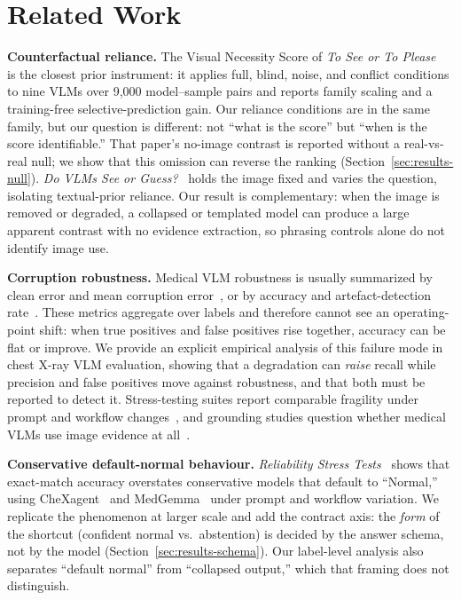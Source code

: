 \section{Related Work}
\label{sec:related}

\textbf{Counterfactual reliance.} The Visual Necessity Score of \emph{To See or To Please}~\citep{hong2026see} is the closest prior instrument: it applies full, blind, noise, and conflict conditions to nine VLMs over 9,000 model--sample pairs and reports family scaling and a training-free selective-prediction gain. Our reliance conditions are in the same family, but our question is different: not ``what is the score'' but ``when is the score identifiable.'' That paper's no-image contrast is reported without a real-vs-real null; we show that this omission can reverse the ranking (Section~\ref{sec:results-null}). \emph{Do VLMs See or Guess?}~\citep{singla2026guess} holds the image fixed and varies the question, isolating textual-prior reliance. Our result is complementary: when the image is removed or degraded, a collapsed or templated model can produce a large apparent contrast with no evidence extraction, so phrasing controls alone do not identify image use.

\textbf{Corruption robustness.} Medical VLM robustness is usually summarized by clean error and mean corruption error~\citep{imam2025corruption}, or by accuracy and artefact-detection rate~\citep{cheng2025robustness}. These metrics aggregate over labels and therefore cannot see an operating-point shift: when true positives and false positives rise together, accuracy can be flat or improve. We provide an explicit empirical analysis of this failure mode in chest X-ray VLM evaluation, showing that a degradation can \emph{raise} recall while precision and false positives move against robustness, and that both must be reported to detect it. Stress-testing suites report comparable fragility under prompt and workflow changes~\citep{gu2025illusion}, and grounding studies question whether medical VLMs use image evidence at all~\citep{felizzi2025grounded}.

\textbf{Conservative default-normal behaviour.} \emph{Reliability Stress Tests}~\citep{yang2026stress} shows that exact-match accuracy overstates conservative models that default to ``Normal,'' using CheXagent~\citep{chen2024chexagent} and MedGemma~\citep{sellergren2025medgemma} under prompt and workflow variation. We replicate the phenomenon at larger scale and add the contract axis: the \emph{form} of the shortcut (confident normal vs.\ abstention) is decided by the answer schema, not by the model (Section~\ref{sec:results-schema}). Our label-level analysis also separates ``default normal'' from ``collapsed output,'' which that framing does not distinguish.

